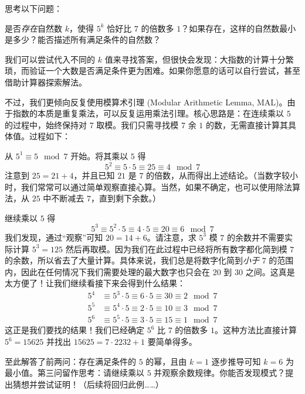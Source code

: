 \begin{example}
    思考以下问题：

    是否\emph{存在}自然数 $k$，使得 $5^k$ 恰好比 $7$ 的倍数多 $1$？如果存在，这样的自然数最小是多少？能否描述所有满足条件的自然数？

    我们可以尝试代入不同的 $k$ 值来寻找答案，但很快会发现：大指数的计算十分繁琐，而验证一个大数是否满足条件更为困难。如果你愿意的话可以自行尝试，甚至借助计算器探索解法。

    不过，我们更倾向反复使用模算术引理 (Modular Arithmetic Lemma, MAL)。由于指数的本质是重复乘法，可以反复运用乘法引理。核心思路是：在连续乘以 $5$ 的过程中，始终保持对 $7$ 取模。我们只需寻找模 $7$ 余 $1$ 的数，无需直接计算其具体值。过程如下：

    从 $5^1 \equiv 5 \mod 7$ 开始。将其乘以 $5$ 得
    \[5^2 \equiv 5 \cdot 5 \equiv 25 \equiv 4 \mod 7\]
    注意到 $25 = 21 + 4$，并且已知 $21$ 是 $7$ 的倍数，从而得出上述结论。（当数字较小时，我们常常可以通过简单观察直接心算。当然，如果不确定，也可以使用除法算法，从 $25$ 中不断减去 $7$，直到剩下余数。）

    继续乘以 $5$ 得
    \[5^3 \equiv 5^2 \cdot 5 \equiv 4 \cdot 5 \equiv 20 \equiv 6 \mod 7\]
    我们发现，通过``观察''可知 $20 = 14+6$。请注意，求 $5^3$ 模 $7$ 的余数并不需要实际计算 $5^3 = 125$ 然后再取模。因为我们在此过程中已经将所有数字都化简到模 $7$ 的余数，所以省去了大量计算。具体来说，我们总是将数字化简到\emph{小于} $7$ 的范围内，因此在任何情况下我们需要处理的最大数字也只会在 $20$ 到 $30$ 之间。这真是太方便了！让我们继续看接下来会得到什么结果：
    \begin{align*}
        5^4 &\equiv 5^3 \cdot 5 \equiv 6 \cdot 5 \equiv 30 \equiv 2 \mod 7 \\ 
        5^5 &\equiv 5^4 \cdot 5 \equiv 2 \cdot 5 \equiv 10 \equiv 3 \mod 7 \\
        5^6 &\equiv 5^5 \cdot 5 \equiv 3 \cdot 5 \equiv 15 \equiv 1 \mod 7 
    \end{align*}
    这正是我们要找的结果！我们已经确定 $5^6$ 比 $7$ 的倍数多 $1$。这种方法比直接计算 $5^6 = 15625$ 并找出 $15625 = 7 \cdot 2232 + 1$ 要简单得多。

    至此解答了前两问：存在满足条件的 $5$ 的幂，且由 $k=1$ 逐步推导可知 $k=6$ 为最小值。第三问留作思考：请继续乘以 $5$ 并观察余数规律。你能否发现模式？提出猜想并尝试证明！（后续将回归此例……）
\end{example}

